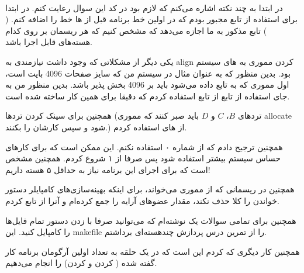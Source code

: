 \\\noindent
در ابتدا به چند نکته اشاره می‌کنم که لازم بود در کد این سوال رعایت کنم.
در ابتدا برای استفاده از تابع
مجبور بودم که در اولین خط برنامه قبل از
ها
خط
را اضافه کنم.
(
)
تابع مذکور به ما اجازه می‌دهد که مشخص کنیم که هر ریسمان بر روی کدام هسته‌های
قابل اجرا باشد.

یکی دیگر از مشکلاتی که وجود داشت نیازمندی به
align
کردن مموری به
های
سیستم بود. بدین منظور که به عنوان مثال در سیستم من که سایز صفحات 4096 بایت است،‌ اول مموری که
به تابع
داده می‌شود باید بر 4096 بخش پذیر باشد.
بدین منظور من به جای استفاده از تابع
از تابع
استفاده کردم که دقیقا برای همین کار ساخته شده است.

همچنین برای سینک کردن ترد‌ها
(ترد‌های $B$، $C$ و $D$ باید صبر کنند که مموری allocate شود و سپس کارشان را بکنند.)
از های 
استفاده کردم.

همچنین ترجیح دادم که از
شماره ۰ استفاده نکنم. این
ممکن است که برای کار‌های حساس سیستم بیشتر استفاده شود پس صرفا از ۱ شروع کردم.
همچنین مشخص است که برای اجرای این برنامه نیاز به حداقل ۵ هسته داریم!

همچنین در ریسمانی که از مموری می‌خواند، برای اینکه بهینه‌سازی‌های کامپایلر دستور خواندن را کلا
حذف نکند، مقدار عضو‌های آرایه را جمع کرده‌ام و آنرا از تابع
کردم.

همچنین برای تمامی سوالات یک
نوشته‌ام که می‌توانید صرفا با زدن دستور
تمام فایل‌ها را کامپایل کنید. این makefile
را از تمرین درس پردازش چند‌هسته‌ای برداشتم.

همچنین کار دیگری که کردم این است که در یک حلقه به تعداد اولین آرگومان برنامه کار گفته شده
( کردن و  کردن)
را انجام می‌دهیم.

